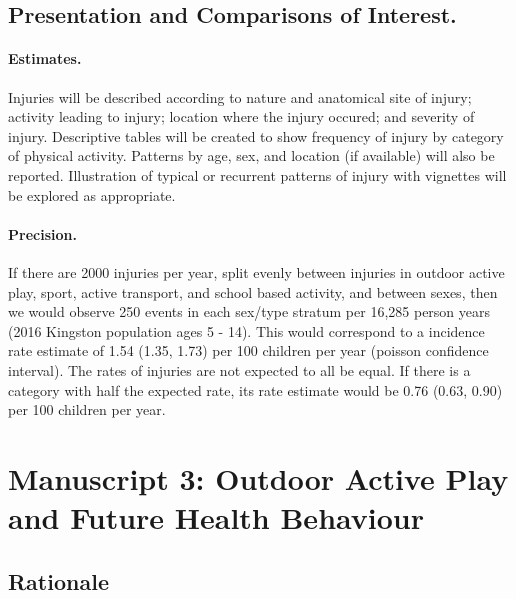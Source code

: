 \documentclass [11pt]{article}
\begin{document}
\subsection{Presentation and Comparisons of Interest.} 

\paragraph{Estimates.} Injuries will be described according to nature and anatomical site of injury; activity leading to injury; location where the injury occured; and severity of injury. Descriptive tables will be created to show frequency of injury by category of physical activity. Patterns by age, sex, and location (if available) will also be reported. Illustration of typical or recurrent patterns of injury with vignettes will be explored as appropriate.~\cite{Pickett2003-zj}

\paragraph{Precision.} If there are 2000 injuries per year, split evenly between injuries in outdoor active play, sport, active transport, and school based activity, and between sexes, then we would observe 250 events in each sex/type stratum per 16,285 person years (2016 Kingston population ages 5 - 14). This would correspond to a incidence rate estimate of 1.54 (1.35, 1.73) per 100 children per year (poisson confidence interval). The rates of injuries are not expected to all be equal. If there is a category with half the expected rate, its rate estimate would be 0.76 (0.63, 0.90) per 100 children per year. 


\section{Manuscript 3: Outdoor Active Play and Future Health Behaviour}

\subsection{Rationale} 
\end{document}
